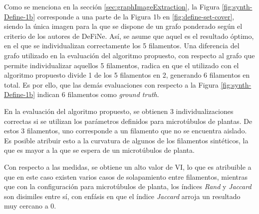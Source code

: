 \clearpage
\newpage




Como se menciona en la secci\'on \ref{sec:graphImageExtraction}, la Figura \ref{fig:synth-Define-1b} corresponde a una parte de la Figura 1b en \ref{fig:define-set-cover}, siendo la \'unica imagen para la que se dispone de un grafo ponderado seg\'un el criterio de los autores de DeFiNe. As\'i, se asume que aquel es el resultado \'optimo, en el que se individualizan correctamente los 5 filamentos. Una diferencia del grafo utilizado en la evaluaci\'on del algoritmo propuesto, con respecto al grafo que permite individualizar aquellos 5 filamentos, radica en que el utilizado con el algoritmo propuesto divide 1 de los 5 filamentos en 2, generando 6 filamentos en total. Es por ello, que las dem\'as evaluaciones con respecto a la Figura \ref{fig:synth-Define-1b} indican 6 filamentos como {\it ground truth}.


En la evaluaci\'on del algoritmo propuesto, se obtienen 3 individualizaciones correctas si se utilizan los par\'ametros definidos para microt\'ubulos de plantas. De estos 3 filamentos, uno corresponde a un filamento que no se encuentra aislado. Es posible atribuir esto a la curvatura de algunos de los filamentos sint\'eticos, la que es mayor a la que se espera de un microt\'ubulos de planta.


Con respecto a las medidas, se obtiene un alto valor de VI, lo que es atribuible a que en este caso existen varios casos de solapamiento entre filamentos, mientras que con la configuraci\'on para microt\'ubulos de planta, los \'indices {\it Rand} y {\it Jaccard} son disimiles entre s\'i, con enf\'asis en que el \'indice {\it Jaccard} arroja un resultado muy cercano a 0.


